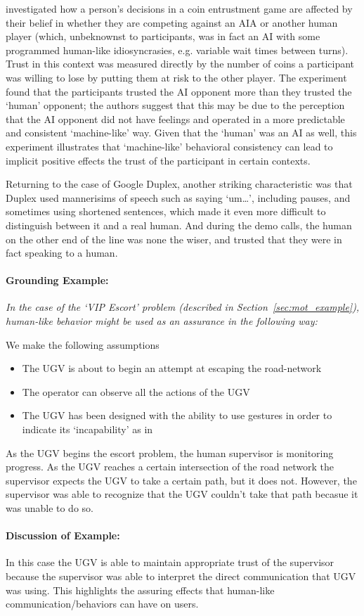 \citet{Wu2016-ei} investigated how a person's decisions in a coin entrustment game are affected by their belief in whether they are competing against an AIA or another human player (which, unbeknownst to participants, was in fact an AI with some programmed human-like idiosyncrasies, e.g. variable wait times between turns). Trust in this context was measured directly by the number of coins a participant was willing to lose by putting them at risk to the other player. The experiment found that the participants trusted the AI opponent more than they trusted the `human' opponent; the authors suggest that this may be due to the perception that the AI opponent did not have feelings and operated in a more predictable and consistent `machine-like' way. Given that the `human' was an AI as well, this experiment illustrates that `machine-like' behavioral consistency can lead to implicit positive effects the trust of the participant in certain contexts.

Returning to the case of Google Duplex, another striking characteristic was that Duplex used mannerisims of speech such as saying `um\ldots', including pauses, and sometimes using shortened sentences, which made it even more difficult to distinguish between it and a real human. And during the demo calls, the human on the other end of the line was none the wiser, and trusted that they were in fact speaking to a human.

\paragraph{\textbf{Grounding Example:}}
{\em
In the case of the `VIP Escort' problem (described in Section~\ref{sec:mot_example}), human-like behavior might be used as an assurance in the following way:

We make the following assumptions

\begin{itemize}
    \item The UGV is about to begin an attempt at escaping the road-network
    \item The operator can observe all the actions of the UGV
    \item The UGV has been designed with the ability to use gestures in order to indicate its `incapability' as in \cite{Kwon2018-xt}
\end{itemize}

As the UGV begins the escort problem, the human supervisor is monitoring progress. As the UGV reaches a certain intersection of the road network the supervisor expects the UGV to take a certain path, but it does not. However, the supervisor was able to recognize that the UGV couldn't take that path becasue it was unable to do so.
}

\paragraph{\textbf{Discussion of Example:}} In this case the UGV is able to maintain appropriate trust of the supervisor because the supervisor was able to interpret the direct communication that UGV was using. This highlights the assuring effects that human-like communication/behaviors can have on users.
